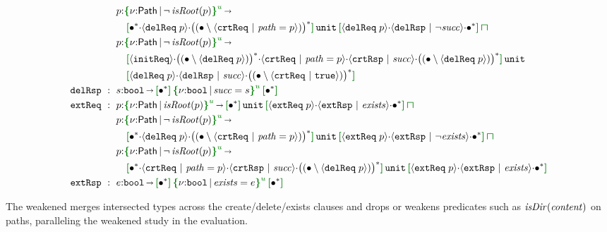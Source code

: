 {\begin{align*}
  & p{:}\urt{\mathsf{Path}}{\neg\,\I{isRoot}(p)} \sarr
  \\ & \quad
    \effLR{\allA \seqA \msgA{delReq}{p} \seqA \SNegStar{\msg{crtReq}{\I{path}=p}}}\,\Code{unit}\,
    \effLR{\msgA{delReq}{p} \seqA \msg{delRsp}{\neg\mathit{succ}} \seqA \allA} \interty
  \\
  & p{:}\urt{\mathsf{Path}}{\neg\,\I{isRoot}(p)} \sarr
  \\ & \quad
    \effLR{\msgC{initReq}\seqA \SNegStar{\msgA{delReq}{p}} \seqA \msg{crtReq}{\I{path}=p} \seqA \msg{crtRsp}{\mathit{succ}} \seqA \SNegStar{\msgA{delReq}{p}}}\,\Code{unit}\,
  \\ & \quad
    \effLR{\msgA{delReq}{p} \seqA \msg{delRsp}{\mathit{succ}} \seqA \SNegStar{\msg{crtReq}{\true}}}
  \\
  \eff{delRsp} ~:~{}
  & s{:}\Bool \sarr \effLR{\allA}\,\urt{\Code{bool}}{\mathit{succ}=s}\,\effLR{\allA}
  \\
  \eff{extReq} ~:~{}
  & p{:}\urt{\mathsf{Path}}{\I{isRoot}(p)} \sarr \effLR{\allA}\,\Code{unit}\,
    \effLR{\msgA{extReq}{p} \seqA \msg{extRsp}{\mathit{exists}} \seqA \allA} \interty
  \\
  & p{:}\urt{\mathsf{Path}}{\neg\,\I{isRoot}(p)} \sarr
  \\ & \quad
    \effLR{\allA \seqA \msgA{delReq}{p} \seqA \SNegStar{\msg{crtReq}{\I{path}=p}}}\,\Code{unit}\,
    \effLR{\msgA{extReq}{p} \seqA \msg{extRsp}{\neg\mathit{exists}} \seqA \allA} \interty
  \\
  & p{:}\urt{\mathsf{Path}}{\neg\,\I{isRoot}(p)} \sarr
  \\ & \quad
    \effLR{\allA \seqA \msg{crtReq}{\I{path}=p} \seqA \msg{crtRsp}{\mathit{succ}} \seqA \SNegStar{\msgA{delReq}{p}}}\,\Code{unit}\,
    \effLR{\msgA{extReq}{p} \seqA \msg{extRsp}{\mathit{exists}} \seqA \allA}
  \\
  \eff{extRsp} ~:~{}
  & e{:}\Bool \sarr \effLR{\allA}\,\urt{\Code{bool}}{\mathit{exists}=e}\,\effLR{\allA}
\end{align*}}
\vspace{-.4cm}\par\nobreak\noindent
The weakened \tyName{} merges intersected types across the create/delete/exists clauses and drops or weakens predicates such as \(\mathit{isDir}(\mathit{content})\) on paths, paralleling the weakened study in the evaluation.

\newpage
